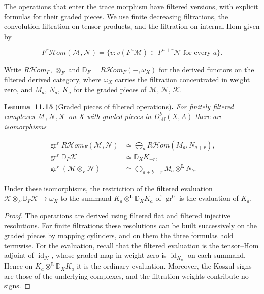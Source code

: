 \documentclass[11pt]{article}
\newenvironment{bpstatement}[2]{\par\addvspace{0.6\baselineskip}\noindent\textbf{#1}#2\textbf{.}\enspace\ignorespaces}
  {\par\addvspace{0.4\baselineskip}}
\newenvironment{bpstatementit}[2]{\begin{bpstatement}{#1}{#2}\itshape\ignorespaces}{\end{bpstatement}}
\providecommand{\cHom}{}\renewcommand{\cHom}{R\mathcal{H}\!om}
\begin{document}
The operations that enter the trace morphism have filtered versions, with explicit formulas for their graded pieces. We use finite decreasing filtrations, the convolution filtration on tensor products, and the filtration on internal Hom given by

\[
F^r\mathcal Hom(\mathcal M,\mathcal N)
=\{v:v(F^a\mathcal M)\subset F^{a+r}\mathcal N
\text{ for every }a\}.
\]

Write \(\cHom_F\), \(\otimes_F\) and \(\mathbb D_F=\cHom_F(-,\omega_X)\) for the derived functors on the filtered derived category, where \(\omega_X\) carries the filtration concentrated in weight zero, and \(M_a\), \(N_a\), \(K_a\) for the graded pieces of \(\mathcal M\), \(\mathcal N\), \(\mathcal K\).

\label{bp42}%
\begin{bpstatementit}{Lemma~11.15}{ (Graded pieces of filtered operations)}
For finitely filtered complexes \(\mathcal M,\mathcal N,\mathcal K\) on \(X\) with graded pieces in \(D^b_{\mathrm{ctf}}(X,A)\) there are isomorphisms

\[
\begin{aligned}
\operatorname{gr}^r\cHom_F(\mathcal M,\mathcal N)
&\simeq\bigoplus_a\cHom(M_a,N_{a+r}),\\
\operatorname{gr}^r\mathbb D_F\mathcal K&\simeq \mathbb D_XK_{-r},\\
\operatorname{gr}^r(\mathcal M\otimes_F\mathcal N)
&\simeq\bigoplus_{a+b=r}M_a\otimes^{\mathbf L} N_b.
\end{aligned}
\]

Under these isomorphisms, the restriction of the filtered evaluation \(\mathcal K\otimes_F\mathbb D_F\mathcal K\to\omega_X\) to the summand \(K_a\otimes^{\mathbf L}\mathbb D_XK_a\) of \(\operatorname{gr}^0\) is the evaluation of \(K_a\).
\end{bpstatementit}

\begin{proof}[{Proof}]\label{bp43}%
The operations are derived using filtered flat and filtered injective resolutions. For finite filtrations these resolutions can be built successively on the graded pieces by mapping cylinders, and on them the three formulas hold termwise. For the evaluation, recall that the filtered evaluation is the tensor–Hom adjoint of \(\operatorname{id}_{\mathcal K}\), whose graded map in weight zero is \(\operatorname{id}_{K_a}\) on each summand. Hence on \(K_a\otimes^{\mathbf L}\mathbb D_XK_a\) it is the ordinary evaluation. Moreover, the Koszul signs are those of the underlying complexes, and the filtration weights contribute no signs.
\end{proof}
\end{document}
